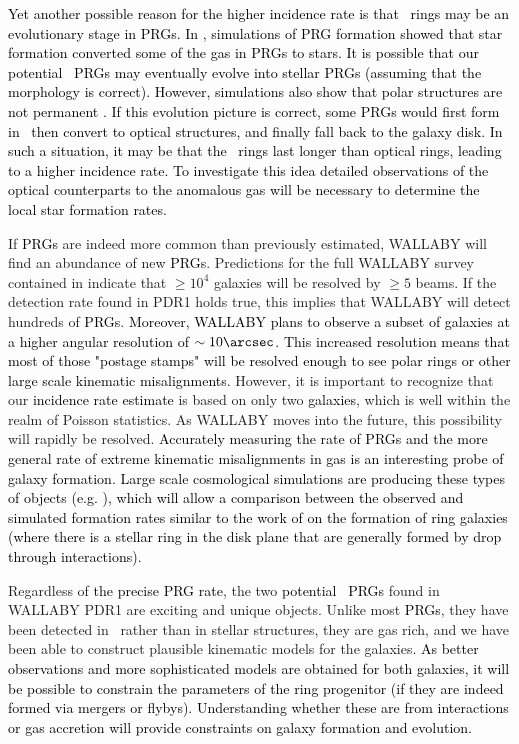 \documentclass[fleqn,usenatbib]{mnras}
\newcommand{\hi}{\text{H\,\sc{i}}}
\begin{document}
\textcolor{black}{Yet another possible reason for the higher incidence rate is that \hi\ rings may be an evolutionary stage in PRGs.  In \citet{Bekki1997}, simulations of PRG formation showed that star formation converted some of the gas in PRGs to stars.  It is possible that our \textcolor{black}{potential \hi\ PRGs} may eventually evolve into \textcolor{black}{stellar} PRGs (assuming that the morphology is correct).  However, simulations also show that polar structures are not permanent \citep{Khoperskov2021}.  If this evolution picture is correct, some PRGs would first form in \hi\, then convert to optical structures, and finally fall back to the galaxy disk.  In such a situation, it may be that the \hi\ rings last longer than optical rings, leading to a higher incidence rate.  To investigate this idea detailed observations of the optical counterparts to the anomalous gas will be necessary to determine the local star formation rates.}

If \textcolor{black}{PRGs} are indeed more common than previously estimated, WALLABY will find an abundance of new \textcolor{black}{PRGs}.  Predictions for the full WALLABY survey contained in \citet{Koribalski2020} indicate that $\ge10^4$ galaxies will be resolved by $\ge 5$ beams.  If the detection rate found in PDR1 holds true, this implies that WALLABY will detect hundreds of \textcolor{black}{PRGs}.  \textcolor{black}{Moreover, WALLABY plans to observe a subset of galaxies at a higher angular resolution of $\sim10\arcsec$.  This increased resolution means that most of those "postage stamps" will be resolved enough to see polar rings or other large scale kinematic misalignments.}  However, it is important to recognize that our \textcolor{black}{incidence rate estimate} is based on only two  \textcolor{black}{galaxies}, which is well within the realm of Poisson statistics.  As WALLABY moves into the future, this possibility will rapidly be resolved.  \textcolor{black}{Accurately measuring the rate of PRGs and the more general rate of extreme kinematic misalignments in gas is an interesting probe of galaxy formation.  Large scale cosmological simulations are producing these types of objects (e.g.  \citealt{Maccio2006,Roskar2010}), which will allow a comparison between the observed and simulated formation rates similar to the work of \citet{Elagali2018} on the formation of ring galaxies (where there is a stellar ring in the disk plane that are generally formed by drop through interactions). }




Regardless of \textcolor{black}{the precise PRG rate}, the two \textcolor{black}{potential \hi\ PRGs} found in WALLABY PDR1 are exciting and unique objects.  Unlike most \textcolor{black}{PRGs}, they have been detected in \hi\ rather than in stellar structures, they are gas rich, and we have been able to construct plausible kinematic models for the galaxies.   \textcolor{black}{As better observations and more sophisticated models are obtained for both galaxies, it will be possible to constrain the parameters of the ring progenitor (if they are indeed formed via mergers or flybys).  Understanding whether these are from interactions or gas accretion will provide constraints on galaxy formation and evolution.}
\end{document}
